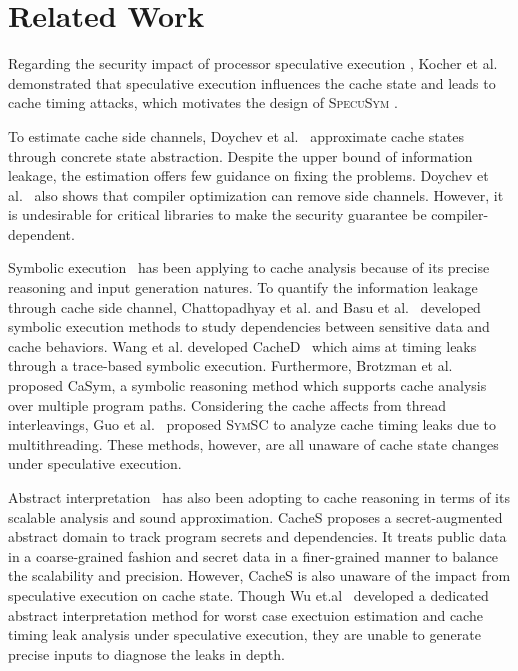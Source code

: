 \documentclass[sigconf]{acmart}
\newcommand{\SpecuSym}{\textsc{SpecuSym} }
\begin{document}
\section{Related Work}
\label{sec:related}

Regarding the security impact of processor speculative execution
\cite{kimuraKT1996}, Kocher et al.~\cite{KocherGGHHLMPSY19} demonstrated 
that speculative execution influences the cache state and leads to cache 
timing attacks, which motivates the design of \SpecuSym. 

To estimate cache side channels, Doychev et al.~\cite{DoychevFKMR13}
approximate cache states through concrete state abstraction. Despite the
upper bound of information leakage, the estimation offers few guidance on 
fixing the problems. Doychev et al.~\cite{DoychevK17} also shows that 
compiler optimization can remove side channels. However, it is undesirable 
for critical libraries to make the security guarantee be compiler-dependent. 

Symbolic execution~\cite{King76} has been applying to cache analysis because
of its precise reasoning and input generation natures. To quantify the 
information leakage through cache side channel, Chattopadhyay et al.
\cite{ChattopadhyayBRZ17,Chattopadhyay17} and Basu et al.~\cite{BasuC17}
developed symbolic execution methods to study dependencies between sensitive 
data and cache behaviors. Wang et al. developed CacheD~\cite{WangWLZW17} which 
aims at timing leaks through a trace-based symbolic execution. Furthermore, 
Brotzman et al.~\cite{BrotzmanLZTK2018} proposed CaSym, a symbolic reasoning 
method which supports cache analysis over multiple program paths. Considering
the cache affects from thread interleavings, Guo et al.~\cite{GuoWW18} proposed
\textsc{SymSC} to analyze cache timing leaks due to multithreading. These methods,
however, are all unaware of cache state changes under speculative execution.  


Abstract interpretation~\cite{CousotC77} has also been adopting to cache 
reasoning in terms of its scalable analysis and sound approximation. CacheS
\cite{CacheS} proposes a secret-augmented abstract domain to track program 
secrets and dependencies. It treats public data in a coarse-grained fashion 
and secret data in a finer-grained manner to balance the scalability and 
precision. However, CacheS is also unaware of the impact from speculative 
execution on cache state. Though Wu et.al~\cite{WuW19} developed a dedicated 
abstract interpretation method for worst case exectuion estimation and cache 
timing leak analysis under speculative execution, they are unable to generate 
precise inputs to diagnose the leaks in depth. 
\end{document}
